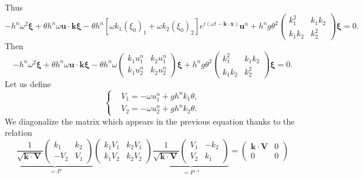 \documentclass[a4paper, 11pt]{article}
\begin{document}
Thus
\begin{equation*}
-h^n\omega^2\boldsymbol{\xi}+\theta h^n\omega \boldsymbol{u}\cdot \boldsymbol{k}\boldsymbol{\xi}-\theta h^n\left[\omega k_1(\xi_0)_1+\omega k_2(\xi_0)_2\right]e^{i(\omega t-\boldsymbol{k}\cdot \boldsymbol{x})}\boldsymbol{u}^n+h^ng\theta^2\begin{pmatrix}k_1^2&k_1k_2\\k_1k_2&k_2^2\end{pmatrix} \boldsymbol{\xi}=0.
\end{equation*}
Then
\begin{equation*}
-h^n\omega^2\boldsymbol{\xi}+\theta h^n\omega \boldsymbol{u}\cdot \boldsymbol{k}\boldsymbol{\xi}-\theta h^n\omega \begin{pmatrix}k_1u_1^n&k_2u_1^n\\ k_1u_2^n&k_2u_2^n\end{pmatrix}\boldsymbol{\xi}+h^ng\theta^2\begin{pmatrix}k_1^2&k_1k_2\\k_1k_2&k_2^2\end{pmatrix} \boldsymbol{\xi}=0.
\end{equation*}
Let us define 
\begin{equation*}
\left\{\begin{split}
&V_1=-\omega u_1^n+gh^nk_1\theta,\\
&V_2=-\omega u_2^n+gh^nk_2\theta.
\end{split}\right.
\end{equation*}
We diagonalize the matrix which appears in the previous equation thanks to the relation
\begin{equation*}
\underbrace{\frac{1}{\sqrt{\boldsymbol{k}\cdot \boldsymbol{V}}}\begin{pmatrix}
k_1&k_2\\
-V_2&V_1
\end{pmatrix}}_{=P}
\begin{pmatrix}
k_1V_1&k_2V_1\\
k_1V_2&k_2V_2
\end{pmatrix}
\underbrace{\frac{1}{\sqrt{\boldsymbol{k}\cdot \boldsymbol{V}}}\begin{pmatrix}
V_1&-k_2\\
V_2&k_1
\end{pmatrix}}_{=P^{-1}}
=\begin{pmatrix}
\boldsymbol{k}\cdot \boldsymbol{V}&0\\0&0
\end{pmatrix}
\end{equation*}
\end{document}

